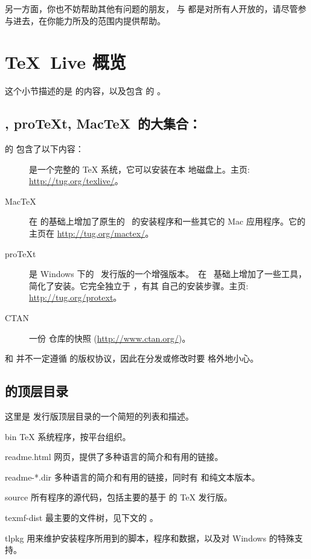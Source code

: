 \documentclass{article}
\begin{document}
另一方面，你也不妨帮助其他有问题的朋友， 与
 都是对所有人开放的，请尽管参与进去，在你能力所及的范围内提供帮助。

\section{\protect\TeX\protect\ Live 概览}
\label{sec:overview-tl}

这个小节描述的是 \TL{} 的内容，以及包含 \TL{} 的 \TK{}。

\subsection{\TL, pro\TeX{}t, Mac\TeX\ 的大集合：\TK}
\label{sec:tl-coll-dists}

\TK{} 的 \DVD{} 包含了以下内容：

\begin{description}

\item [\TL] 是一个完整的 \TeX{} 系统，它可以安装在本
地磁盘上。主页: \url{http://tug.org/texlive/}。

\item [Mac\TeX] 在 \TL{} 的基础上增加了原生的 \MacOSX\ 的安装程序和一些其它的
Mac 应用程序。它的主页在 \url{http://tug.org/mactex/}。

\item [pro\TeX{}t] 是 Windows 下的 \MIKTEX\ 发行版的一个增强版本。\ProTeXt\ 在
\MIKTEX\ 基础上增加了一些工具，简化了安装。它完全独立于 \TL{}，有其
自己的安装步骤。主页: \url{http://tug.org/protext}。

\item [CTAN] 一份 \CTAN{} 仓库的快照 (\url{http://www.ctan.org/})。

\end{description}

\CTAN{} 和  并不一定遵循 \TL{} 的版权协议，因此在分发或修改时要
格外地小心。

\subsection{\TL{} 的顶层目录}
\label{sec:tld}

这里是 \TL{} 发行版顶层目录的一个简短的列表和描述。

\begin{ttdescription}
\item[bin] \TeX{} 系统程序，按平台组织。
%
\item[readme.html] 网页，提供了多种语言的简介和有用的链接。
\item[readme-*.dir] \TL{} 多种语言的简介和有用的链接，同时有 \HTML{}
和纯文本版本。

%
\item[source] 所有程序的源代码，包括主要的基于 \Webc{} 的 \TeX{}
  发行版。
%
\item[texmf-dist] 最主要的文件树，见下文的 。
%
\item[tlpkg] 用来维护安装程序所用到的脚本，程序和数据，以及对
Windows 的特殊支持。
\end{ttdescription}
\end{document}
